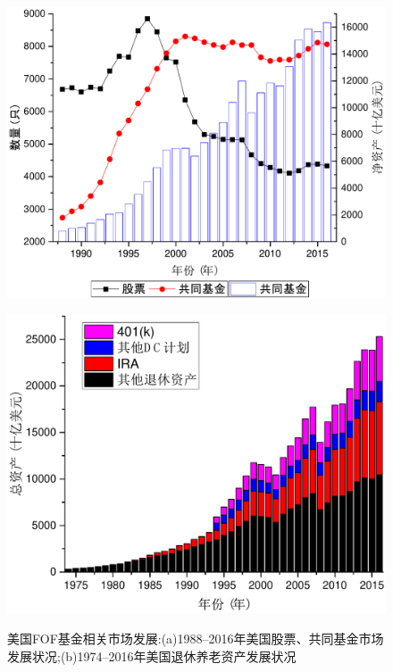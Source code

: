 \begin{figure}[ht]
\begin{minipage}[ht]{0.47\textwidth}
\centering
\includegraphics[width=\textwidth]{pic/mutual.pdf}
\subcaption{}\label{fg:mutual}
\end{minipage}%
\hspace{0.06\textwidth}
\begin{minipage}[ht]{0.47\textwidth}
\centering
\includegraphics[width=\textwidth]{pic/retirement.pdf}
\subcaption{}\label{fg:retirement}
\end{minipage}
\caption{美国FOF基金相关市场发展:(a)1988--2016年美国股票、共同基金市场发展状况;(b)1974--2016年美国退休养老资产发展状况}
\end{figure}

